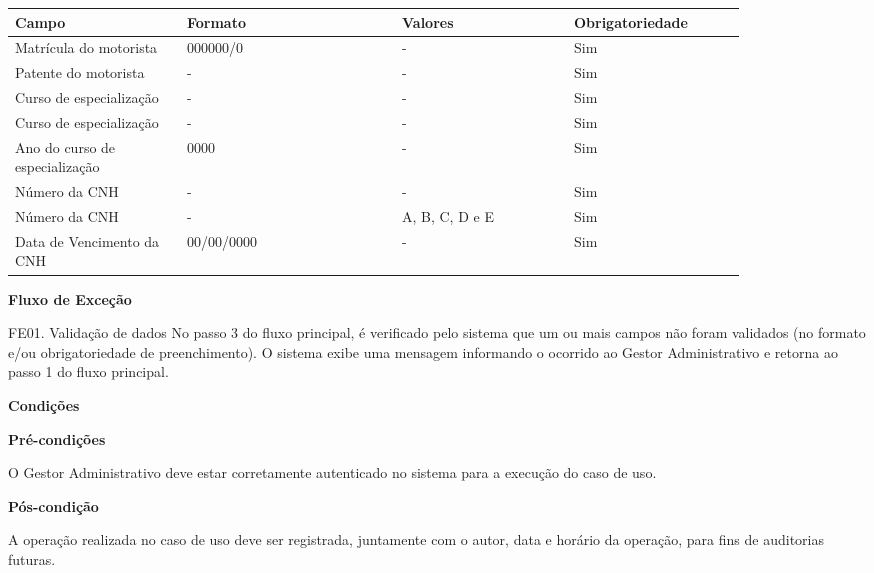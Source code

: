    \begin{table*}[!h]
    \centering
      \begin{tabular}{|p{0.20\linewidth}|p{0.25\linewidth}|p{0.20\linewidth}|p{0.20\linewidth}|}
      \hline
      Campo  & Formato & Valores & Obrigatoriedade\\
      \hline

      Matrícula do motorista & 000000/0 & - & Sim\\ \hline

      Patente do motorista & - & - & Sim\\\hline
      
      Curso de especialização & - & - & Sim\\\hline
      
      Curso de especialização & - & - & Sim\\\hline
      
      Ano do curso de especialização & 0000 & - & Sim\\\hline
      
      Número da CNH & - & - & Sim\\\hline
      
      Número da CNH & - & A, B, C, D e E & Sim\\\hline
      
      Data de Vencimento da CNH & 00/00/0000 & - & Sim\\\hline
      
      \hline
      \end{tabular}
    \end{table*}

    \pagebreak
    
   {\raggedright
      \textbf{Fluxo de Exceção}
   }
   
   FE01. Validação de dados
	No passo 3 do fluxo principal, é verificado pelo sistema que um ou mais campos não foram validados (no formato e/ou
	obrigatoriedade de preenchimento). O sistema exibe uma mensagem informando o ocorrido ao Gestor Administrativo e retorna
	ao passo 1 do fluxo principal.

	
   {\raggedright
      \textbf{Condições}
   }
   
    
   \textbf{Pré-condições}
   
   O Gestor Administrativo deve estar corretamente autenticado no sistema para a execução do caso de uso.
   
   \textbf{Pós-condição}
   
   A operação realizada no caso de uso deve ser registrada, juntamente com o autor, data e horário da operação, para fins de auditorias futuras.




  